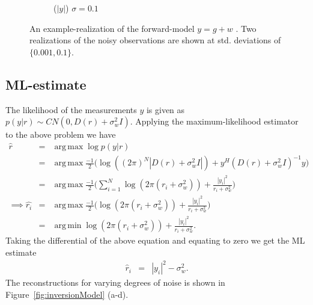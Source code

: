 \documentclass[a4paper, 11pt]{article}
\DeclareMathOperator*{\argmax}{arg\,max}
\DeclareMathOperator*{\argmin}{arg\,min}
\begin{document}
\begin{figure}[h]
\begin{subfigure}[b]{0.22\textwidth}
        \caption{($|y|$) $\sigma=0.1$}
        \label{fig:noisyMeasurement1e-1}
    \end{subfigure}
\caption{An example-realization of the forward-model $y=g+w$ . Two realizations of the noisy observations are shown at std. deviations of $\{0.001, 0.1\}$.}
\label{fig:forwardModel}
\end{figure}

\subsection{ML-estimate}
The likelihood of the measurements $y$ is given as $p(y|r)\sim CN(0,D(r)+\sigma_w^2I)$. Applying the maximum-likelihood estimator to the above problem we have  
\begin{eqnarray*}
\hat{r}&=& \argmax \log p(y|r) \\
&=& \argmax \frac{-1}{2} \Bigg( \log\left( (2\pi)^N|D(r)+\sigma_w^2I|\right)+y^H (D(r)+\sigma_w^2I)^{-1}y\Bigg) \\
&=& \argmax \frac{-1}{2} \Bigg( \sum_{i=1}^N \log \left( 2\pi (r_i +\sigma_w ^2)\right) +\frac{|y_i|^2}{r_i +\sigma_w^2}\Bigg) \\
\implies \hat{r_i}&=& \argmax \frac{-1}{2} \Bigg( \log \left( 2\pi (r_i +\sigma_w ^2)\right) +\frac{|y_i|^2}{r_i +\sigma_w^2} \Bigg) \\
&=& \argmin \log \left( 2\pi (r_i +\sigma_w ^2)\right) +\frac{|y_i|^2}{r_i +\sigma_w^2}.
\end{eqnarray*}
Taking the differential of the above equation and equating to zero we get the ML estimate   
\begin{eqnarray*}
\hat{r}_i&=&|y_i|^2-\sigma_w^2.
\end{eqnarray*}
The reconstructions for varying degrees of noise is shown in Figure~\ref{fig:inversionModel} (a-d). 
\end{document}
